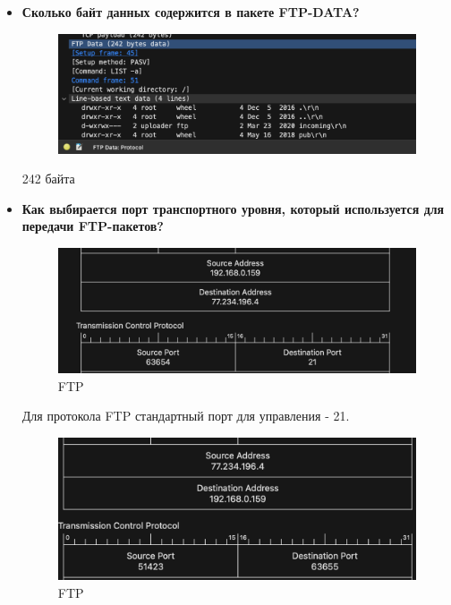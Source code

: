 \documentclass[12pt,onecolumn]{article}
\begin{document}
\begin{itemize}
    \item {
        \textbf{Сколько байт данных содержится в пакете FTP-DATA?}

        \begin{figure}[H]
            \centering
            \includegraphics*[width=\textwidth]{image/part7/ftp-data-size.png}
        \end{figure}
        242 байта

    }
    \item {
        \textbf{Как выбирается порт транспортного уровня, который используется для передачи FTP-пакетов?}

        \begin{figure}[H]
            \centering
            \includegraphics*[width=\textwidth]{image/part7/port-req.png}
            \caption{FTP}
        \end{figure}

        Для протокола FTP стандартный порт для управления - 21.

        \begin{figure}[H]
            \centering
            \includegraphics*[width=\textwidth]{image/part7/port-data.png}
            \caption{FTP}
        \end{figure}

}
\end{itemize}
\end{document}
